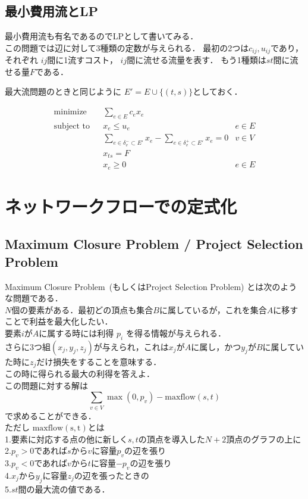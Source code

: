 \documentclass[13pt, a4paper, landscape]{jarticle}
\theoremstyle{nonitalic} %
\begin{document}
\subsection{最小費用流とLP}

最小費用流も有名であるのでLPとして書いてみる． \\
この問題では辺に対して3種類の定数が与えられる． 最初の2つは$c_{ij}, u_{ij}$であり，それぞれ $ij$間に1流すコスト， $ij$間に流せる流量を表す． 
もう1種類は$st$間に流せる量$F$である．

最大流問題のときと同じように $E' = E \cup \{ (t,s) \} $としておく．

\begin{align}
 &&&&&\textrm{minimize}   && \sum_{e\in E} c_e x_e  \\
 &&&&&\textrm{subject to} && x_{e} \leq u_e & e  \in E \\
 &&&&&                    && \sum_{e \in \delta_v^-  \subset E'} x_e - \sum_{e \in \delta_v^+  \subset E'} x_e= 0 & v \in V  &&&&& \\
 &&&&&                    && x_{ts} = F \\
 &&&&&                    && x_e \geq 0 & e \in E &&&&&
\end{align}



\section{ネットワークフローでの定式化}
\subsection{Maximum Closure Problem / Project Selection Problem}
Maximum Closure Problem~(もしくはProject Selection Problem) とは次のような問題である．\\

$N$個の要素がある．最初どの頂点も集合$B$に属しているが，これを集合$A$に移すことで利益を最大化したい． \\
要素$i$が$A$に属する時には利得 $p_i$ を得る情報が与えられる． \\
さらに3つ組$(x_j, y_j, z_j)$が与えられ，これは$x_j$が$A$に属し，かつ$y_j$が$B$に属していた時に$z_j$だけ損失をすることを意味する． \\
この時に得られる最大の利得を答えよ． \\


この問題に対する解は
\[ \sum_{v \in V } \max(0,p_v) - \mathrm{maxflow}(s,t) \]
で求めることができる．\\
ただし $\mathrm{maxflow(s,t)} $とは\\
1.要素に対応する点の他に新しく$s,t$の頂点を導入した$N+2$頂点のグラフの上に\\
2.$p_v>0$であれば$s$から$v$に容量$p_v$の辺を張り\\
3.$p_v<0$であれば$v$から$t$に容量$-p_v$の辺を張り \\
4.$x_j$から$y_j$に容量$z_j$の辺を張ったときの\\
5.$st$間の最大流の値である．
\end{document}
